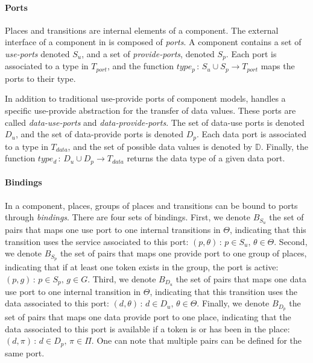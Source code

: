 \paragraph{Ports}{

Places and transitions are internal elements of a \mad component.
The external interface of a component in \mad is
composed of \emph{ports}. A component contains a set of \emph{use-ports}
denoted $S_{u}$, and a set of \emph{provide-ports}, denoted
$S_{p}$. Each port is associated to a type in $T_{port}$, and the
function $type_{p}\,:\,S_{u}\cup S_{p}\rightarrow T_{port}$ maps the ports
to their type. 

In addition to traditional use-provide ports of component models,
\mad handles a specific use-provide abstraction for the
transfer of data values. These ports are called \emph{data-use-ports}
and \emph{data-provide-ports}. The set of data-use ports is denoted
$D_{u}$, and the set of data-provide ports is denoted
$D_{p}$. Each data port is associated to a type in $T_{data}$,
and the set of possible data values is denoted
by $\mathbb{D}$. Finally, the function $type_{d}\,:\,D_{u}\cup
D_{p}\rightarrow T_{data}$ returns the data type of a given data port.
  
}

\paragraph{Bindings}{

  In a \mad component, places, groups of places and transitions can be
  bound to ports through \emph{bindings}. There are four sets of
  bindings.  First, we denote $B_{S_{u}}$ the set of pairs that maps
  one use port to one internal transitions in $\Theta$, indicating
  that this transition uses the service associated to this port:
  $\left(p,\theta\right)\,:\,p\in S_{u},\,\theta\in\Theta$. Second, we
  denote $B_{S_{p}}$ the set of pairs that maps one provide port to
  one group of places, indicating that if at least one token exists in
  the group, the port is active:
  $\left(p,g\right)\,:\,p\in S_{p},\,g\in G$. Third, we denote
  $B_{D_{u}}$ the set of pairs that maps one data use port to one
  internal transition in $\Theta$, indicating that this transition
  uses the data associated to this port:
  $\left(d,\theta\right)\,:\,d\in D_{u},\,\theta\in\Theta$. Finally,
  we denote $B_{D_{p}}$ the set of pairs that maps one data provide
  port to one place, indicating that the data associated to this port
  is available if a token is or has been in the place:
  $\left(d,\pi\right)\,:\,d\in D_{p},\,\pi\in \Pi$. One can note that
  multiple pairs can be defined for the same port.}

